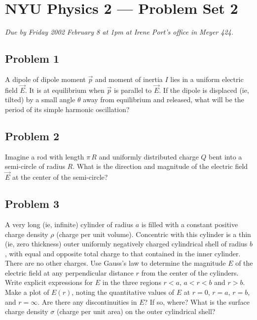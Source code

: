 \documentclass{article}
\begin{document}
\thispagestyle{empty}
\section*{NYU Physics 2 --- Problem Set 2}

\emph{Due by Friday 2002 February 8 at 1pm at Irene Port's office in
Meyer 424.}

\subsection*{Problem 1}

A dipole of dipole moment $\vec{p}$ and moment of inertia $I$ lies in
a uniform electric field $\vec{E}$.  It is at equilibrium when
$\vec{p}$ is parallel to $\vec{E}$.  If the dipole is displaced (ie,
tilted) by a small angle $\theta$ away from equilibrium and released,
what will be the period of its simple harmonic oscillation?

\subsection*{Problem 2}

Imagine a rod with length $\pi\,R$ and uniformly distributed charge
$Q$ bent into a semi-circle of radius $R$.  What is the direction and
magnitude of the electric field $\vec{E}$ at the center of the
semi-circle?

\subsection*{Problem 3}

A very long (ie, infinite) cylinder of radius $a$ is filled with a
constant positive charge density $\rho$ (charge per unit volume).
Concentric with this cylinder is a thin (ie, zero thickness) outer
uniformly negatively charged cylindrical shell of radius $b$, with
equal and opposite total charge to that contained in the inner
cylinder.  There are no other charges.  Use Gauss's law to determine
the magnitude $E$ of the electric field at any perpendicular distance
$r$ from the center of the cylinders.  Write explicit expressions for
$E$ in the three regions $r<a$, $a<r<b$ and $r>b$.  Make a plot of
$E(r)$, noting the quantitative values of $E$ at $r=0$, $r=a$, $r=b$,
and $r=\infty$.  Are there any discontinuities in $E$?  If so, where?
What is the surface charge density $\sigma$ (charge per unit area) on
the outer cylindrical shell?
\end{document}
